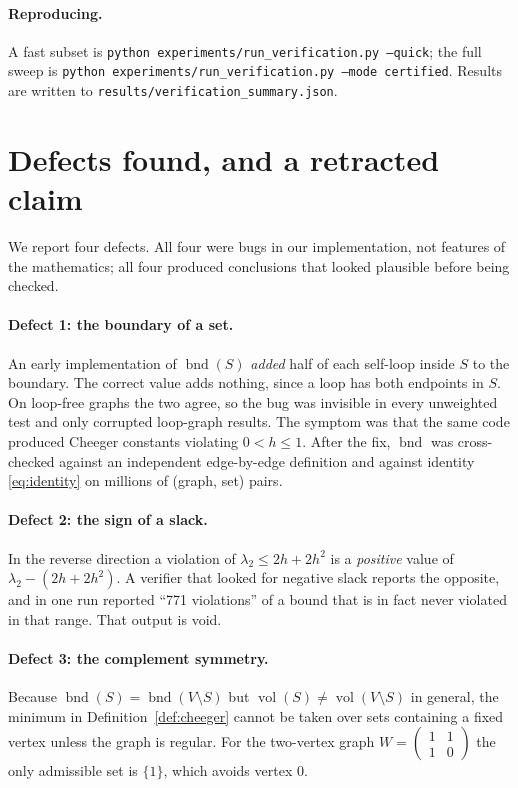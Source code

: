 \documentclass[11pt,a4paper]{article}
\theoremstyle{plain}
\theoremstyle{definition}
\DeclareMathOperator{\vol}{vol}
\DeclareMathOperator{\bnd}{bnd}
\begin{document}
\paragraph{Reproducing.}
A fast subset is \texttt{python experiments/run\_verification.py --quick}; the
full sweep is \texttt{python experiments/run\_verification.py --mode certified}.
Results are written to \texttt{results/verification\_summary.json}.

\section{Defects found, and a retracted claim}\label{sec:defects}

We report four defects.  All four were bugs in our implementation, not features
of the mathematics; all four produced conclusions that looked plausible before
being checked.

\paragraph{Defect 1: the boundary of a set.}
An early implementation of $\bnd(S)$ \emph{added} half of each self-loop inside
$S$ to the boundary.  The correct value adds nothing, since a loop has both
endpoints in $S$.  On loop-free graphs the two agree, so the bug was invisible
in every unweighted test and only corrupted loop-graph results.  The symptom was
that the same code produced Cheeger constants violating
$0<h\le 1$.  After the fix, $\bnd$ was cross-checked against an independent
edge-by-edge definition and against identity \eqref{eq:identity} on millions of
(graph, set) pairs.

\paragraph{Defect 2: the sign of a slack.}
In the reverse direction a violation of $\lambda_2\le 2h+2h^2$ is a
\emph{positive} value of $\lambda_2-(2h+2h^2)$.  A verifier that looked for
negative slack reports the opposite, and in one run reported ``771 violations''
of a bound that is in fact never violated in that range.  That output is void.

\paragraph{Defect 3: the complement symmetry.}
Because $\bnd(S)=\bnd(V\setminus S)$ but $\vol(S)\ne\vol(V\setminus S)$ in
general, the minimum in Definition~\ref{def:cheeger} cannot be taken over
sets containing a fixed vertex unless the graph is regular.  For the two-vertex
graph $W=\begin{pmatrix}1&1\\1&0\end{pmatrix}$ the only admissible set is
$\{1\}$, which avoids vertex $0$.
\end{document}
